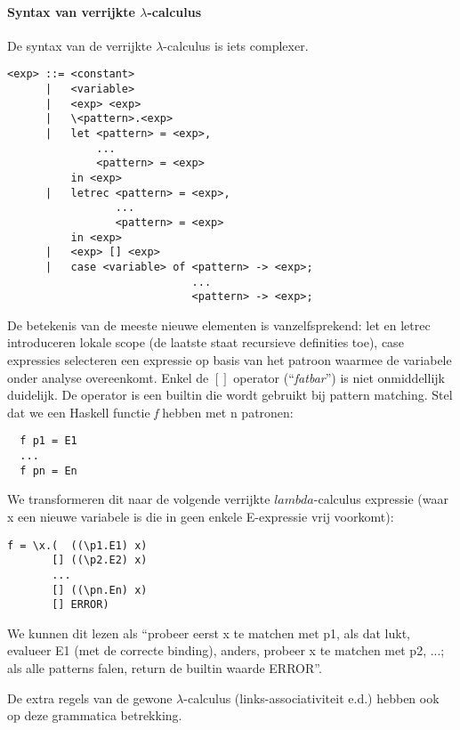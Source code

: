 \documentclass[a4paper,10pt]{article}
\begin{document}
\paragraph {Syntax van verrijkte $\lambda$-calculus}
De syntax van de verrijkte $\lambda$-calculus is iets complexer.
\begin{verbatim}
<exp> ::= <constant>
      |   <variable>
      |   <exp> <exp>
      |   \<pattern>.<exp>
      |   let <pattern> = <exp>,
              ...
              <pattern> = <exp>
          in <exp>
      |   letrec <pattern> = <exp>,
                 ...
                 <pattern> = <exp>
          in <exp>
      |   <exp> [] <exp>
      |   case <variable> of <pattern> -> <exp>;
                             ...
                             <pattern> -> <exp>;
\end{verbatim}
De betekenis van de meeste nieuwe elementen is vanzelfsprekend: let en letrec introduceren lokale scope (de laatste staat recursieve definities toe), case expressies selecteren een expressie op basis van het patroon waarmee de variabele onder analyse overeenkomt.
Enkel de $[]$ operator (``\emph{fatbar}'') is niet onmiddellijk duidelijk. De operator is een builtin die wordt gebruikt bij pattern matching. Stel dat we een Haskell functie \emph{f} hebben met n patronen:
\begin{lstlisting}
  f p1 = E1
  ...
  f pn = En
\end{lstlisting}
We transformeren dit naar de volgende verrijkte $lambda$-calculus expressie (waar x een nieuwe variabele is die in geen enkele E-expressie vrij voorkomt):
\begin{verbatim}
f = \x.(  ((\p1.E1) x)
       [] ((\p2.E2) x)
       ...
       [] ((\pn.En) x)
       [] ERROR)
\end{verbatim}
We kunnen dit lezen als ``probeer eerst x te matchen met p1, als dat lukt, evalueer E1 (met de correcte binding), anders, probeer x te matchen met p2, ...; als alle patterns falen, return de builtin waarde ERROR''.

De extra regels van de gewone $\lambda$-calculus (links-associativiteit e.d.) hebben ook op deze grammatica betrekking.
\end{document}

